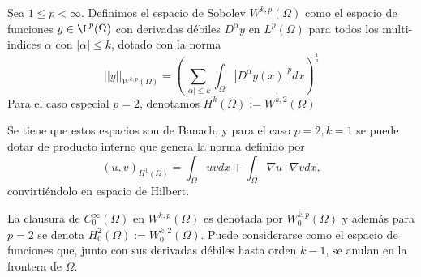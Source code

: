 \documentclass{article}
\begin{document}
\theoremstyle{definition}
\begin{definition}
Sea $1\leq p<\infty$. Definimos el espacio de Sobolev $W^{k,p}(\Omega)$ como el espacio de funciones $y\in \L^p(\Omega)$ con derivadas débiles $D^{\alpha}y$ en $L^p(\Omega)$ para todos los multi-indices $\alpha$ con $|\alpha|\leq k$, dotado con la norma
\begin{equation}
    ||y||_{W^{k,p}(\Omega)}=\left(\sum_{|\alpha|\leq k}\int_{\Omega}|D^\alpha y(x)|^pdx\right)^\frac{1}{p}
\end{equation}
Para el caso especial $p=2$, denotamos $H^k(\Omega):=W^{k,2}(\Omega)$
\end{definition}

\noindent
Se tiene que estos espacios son de Banach, y para el caso $p=2, k=1$ se puede dotar de producto interno que genera la norma definido por 
\begin{equation}
    (u,v)_{H^1(\Omega)}=\int_{\Omega}uvdx+\int_{\Omega}\nabla u\cdot \nabla v dx,
\end{equation}
convirtiéndolo en espacio de Hilbert.
\theoremstyle{definition}
\begin{definition}
La clausura de $C_0^{\infty}(\Omega)$ en $W^{k,p}(\Omega)$ es denotada por $ W_0^{k,p}(\Omega)$ y además para $p=2$ se denota $H_0^2(\Omega):=W_0^{k,2}(\Omega)$. Puede considerarse como el espacio de funciones que, junto con sus derivadas débiles hasta orden $k-1$, se anulan en la frontera de $\Omega$.
\end{definition}
\end{document}
